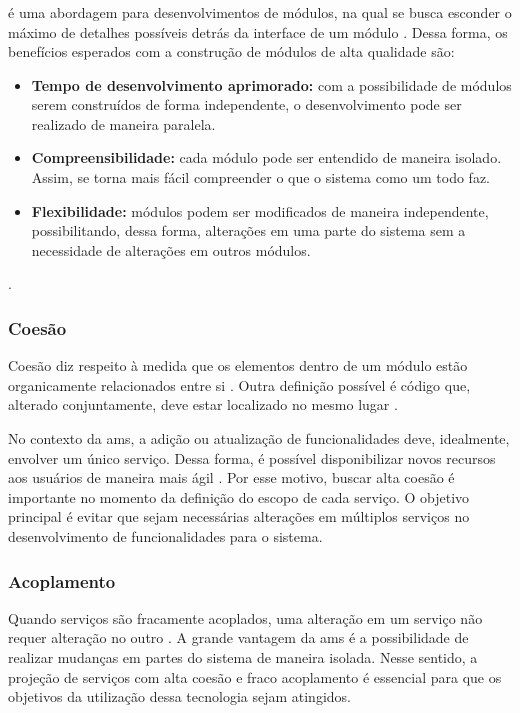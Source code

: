 \subsubsection{}
 é uma abordagem para desenvolvimentos de módulos, na qual se busca esconder o máximo de detalhes possíveis detrás da interface de um módulo \cite{buildingMicroservices}. Dessa forma, os benefícios esperados com a construção de módulos de alta qualidade são:
\begin{itemize}
    \item \textbf{Tempo de desenvolvimento aprimorado:} com a possibilidade de módulos serem construídos de forma independente, o desenvolvimento pode ser realizado de maneira paralela.
    \item \textbf{Compreensibilidade:} cada módulo pode ser entendido de maneira isolado. Assim, se torna mais fácil compreender o que o sistema como um todo faz.
    \item \textbf{Flexibilidade:} módulos podem ser modificados de maneira independente, possibilitando, dessa forma, alterações em uma parte do sistema sem a necessidade de alterações em outros módulos.
\end{itemize}
\cite{Parnas2012}.

\subsubsection{Coesão}
Coesão diz respeito à medida que os elementos dentro de um módulo estão organicamente relacionados entre si \cite{Yourdon1979}. Outra definição possível é código que, alterado conjuntamente, deve estar localizado no mesmo lugar \cite{buildingMicroservices}. 

No contexto da \acrshort{ams}, a adição ou atualização de funcionalidades deve, idealmente, envolver um único serviço. Dessa forma, é possível disponibilizar novos recursos aos usuários de maneira mais ágil \cite{buildingMicroservices}. Por esse motivo, buscar alta coesão é importante no momento da definição do escopo de cada serviço. O objetivo principal é evitar que sejam necessárias alterações em múltiplos serviços no desenvolvimento de funcionalidades para o sistema.

\subsubsection{Acoplamento}
Quando serviços são fracamente acoplados, uma alteração em um serviço não requer alteração no outro \cite{buildingMicroservices}. A grande vantagem da \acrshort{ams} é a possibilidade de realizar mudanças em partes do sistema de maneira isolada. Nesse sentido, a projeção de serviços com alta coesão e fraco acoplamento é essencial para que os objetivos da utilização dessa tecnologia sejam atingidos.

